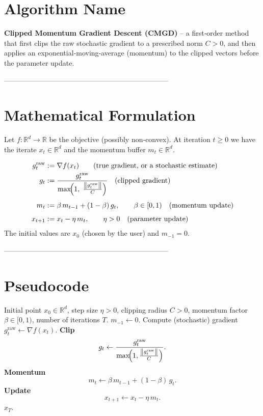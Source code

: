 \documentclass{article}
\newcommand{\R}{\mathbb{R}}
\newcommand{\norm}[1]{\left\lVert#1\right\rVert}
\begin{document}
\section*{Algorithm Name}
\textbf{Clipped Momentum Gradient Descent (CMGD)} – a first‑order method that first clips the raw stochastic gradient to a prescribed norm $C>0$, and then applies an exponential‑moving‑average (momentum) to the clipped vectors before the parameter update.

---------------------------------------------------------------------

\section*{Mathematical Formulation}
Let $f:\R^{d}\to\R$ be the objective (possibly non‑convex).  
At iteration $t\ge 0$ we have the iterate $x_{t}\in\R^{d}$ and the momentum buffer $m_{t}\in\R^{d}$.

\begin{align}
g^{\text{raw}}_{t} &:= \nabla f(x_{t}) \qquad\text{(true gradient, or a stochastic estimate)}\label{eq:raw}\\
g_{t} &:= \frac{g^{\text{raw}}_{t}}{\max\!\Bigl(1,\; \frac{\norm{g^{\text{raw}}_{t}}}{C}\Bigr)}\quad 
\text{(clipped gradient)}\label{eq:clip}\\[4pt]
m_{t} &:= \beta\, m_{t-1} + (1-\beta)\, g_{t},\qquad\beta\in[0,1) \quad\text{(momentum update)}\label{eq:momentum}\\[4pt]
x_{t+1} &:= x_{t} - \eta\, m_{t},\qquad \eta>0 \quad\text{(parameter update)}\label{eq:update}
\end{align}
The initial values are $x_{0}$ (chosen by the user) and $m_{-1}=0$.

---------------------------------------------------------------------

\section*{Pseudocode}
\begin{algorithm}[H]
\caption{Clipped Momentum Gradient Descent (CMGD)}
\begin{algorithmic}[1]
\Require Initial point $x_{0}\in\R^{d}$, step size $\eta>0$, clipping radius $C>0$, momentum factor $\beta\in[0,1)$, number of iterations $T$.
\State $m_{-1}\gets 0$.
    \State Compute (stochastic) gradient $g^{\text{raw}}_{t}\gets\nabla f(x_{t})$.
    \State \textbf{Clip}
    \[
        g_{t}\gets 
        \frac{g^{\text{raw}}_{t}}
        {\max\!\Bigl(1,\frac{\norm{g^{\text{raw}}_{t}}}{C}\Bigr)} .
    \]
    \State \textbf{Momentum}
    \[
        m_{t}\gets \beta\, m_{t-1}+(1-\beta)\, g_{t}.
    \]
    \State \textbf{Update}
    \[
        x_{t+1}\gets x_{t}-\eta\, m_{t}.
    \]
\EndFor
\State \Return $x_{T}$.
\end{algorithmic}
\end{algorithm}
\end{document}
